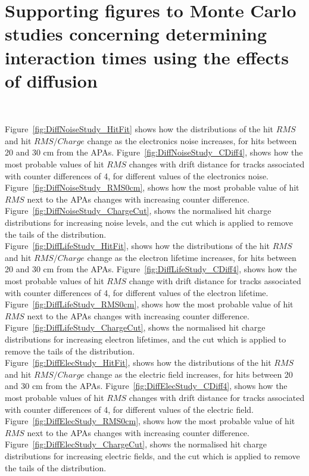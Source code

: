 \chapter{Supporting figures to Monte Carlo studies concerning determining interaction times using the effects of diffusion} ~\label{sec:DiffMCPlots}

\graphicspath{{Appendix1/Figs/PDF/}{Appendix1/Figs/Raster/}{Appendix1/Figs/Vector/}}

Figure~\ref{fig:DiffNoiseStudy_HitFit} shows how the distributions of the hit $RMS$ and hit $RMS/Charge$ change as the electronics noise increases, for hits between 20 and 30 cm from the APAs. Figure~\ref{fig:DiffNoiseStudy_CDiff4}, shows how the most probable values of hit $RMS$ changes with drift distance for tracks associated with counter differences of 4, for different values of the electronics noise. Figure~\ref{fig:DiffNoiseStudy_RMS0cm}, shows how the most probable value of hit $RMS$ next to the APAs changes with increasing counter difference. Figure~\ref{fig:DiffNoiseStudy_ChargeCut}, shows the normalised hit charge distributions for increasing noise levels, and the cut which is applied to remove the tails of the distribution. \\ 

Figure~\ref{fig:DiffLifeStudy_HitFit}, shows how the distributions of the hit $RMS$ and hit $RMS/Charge$ change as the electron lifetime increases, for hits between 20 and 30 cm from the APAs. Figure~\ref{fig:DiffLifeStudy_CDiff4}, shows how the most probable values of hit $RMS$ change with drift distance for tracks associated with counter differences of 4, for different values of the electron lifetime. Figure~\ref{fig:DiffLifeStudy_RMS0cm}, shows how the most probable value of hit $RMS$ next to the APAs changes with increasing counter difference. Figure~\ref{fig:DiffLifeStudy_ChargeCut}, shows the normalised hit charge distributions for increasing electron lifetimes, and the cut which is applied to remove the tails of the distribution. \\ 

Figure~\ref{fig:DiffElecStudy_HitFit}, shows how the distributions of the hit $RMS$ and hit $RMS/Charge$ change as the electric field increases, for hits between 20 and 30 cm from the APAs. Figure~\ref{fig:DiffElecStudy_CDiff4}, shows how the most probable values of hit $RMS$ changes with drift distance for tracks associated with counter differences of 4, for different values of the electric field. Figure~\ref{fig:DiffElecStudy_RMS0cm}, shows how the most probable value of hit $RMS$ next to the APAs changes with increasing counter difference. Figure~\ref{fig:DiffElecStudy_ChargeCut}, shows the normalised hit charge distributions for increasing electric fields, and the cut which is applied to remove the tails of the distribution. \\

